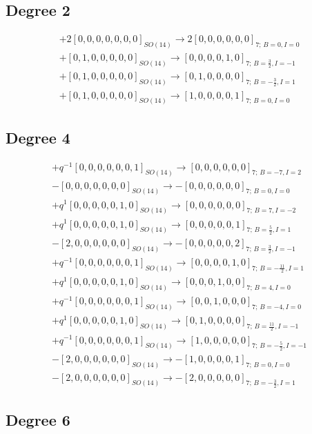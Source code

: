 \documentclass{article}
\begin{document}
\subsection*{Degree 2}
\[\begin{gathered} +2[0,0,0,0,0,0,0]_{SO(14)}\longrightarrow 2[0,0,0,0,0,0]_{7;\,B=0,I=0}\\+[0,1,0,0,0,0,0]_{SO(14)}\longrightarrow [0,0,0,0,1,0]_{7;\,B=\frac{3}{2},I=-1}\\+[0,1,0,0,0,0,0]_{SO(14)}\longrightarrow [0,1,0,0,0,0]_{7;\,B=-\frac{3}{2},I=1}\\+[0,1,0,0,0,0,0]_{SO(14)}\longrightarrow [1,0,0,0,0,1]_{7;\,B=0,I=0}\end{gathered}\]\subsection*{Degree 4}
\[\begin{gathered} +q^{-1}[0,0,0,0,0,0,1]_{SO(14)}\longrightarrow [0,0,0,0,0,0]_{7;\,B=-7,I=2}\\-[0,0,0,0,0,0,0]_{SO(14)}\longrightarrow -[0,0,0,0,0,0]_{7;\,B=0,I=0}\\+q^{1}[0,0,0,0,0,1,0]_{SO(14)}\longrightarrow [0,0,0,0,0,0]_{7;\,B=7,I=-2}\\+q^{1}[0,0,0,0,0,1,0]_{SO(14)}\longrightarrow [0,0,0,0,0,1]_{7;\,B=\frac{5}{2},I=1}\\-[2,0,0,0,0,0,0]_{SO(14)}\longrightarrow -[0,0,0,0,0,2]_{7;\,B=\frac{3}{2},I=-1}\\+q^{-1}[0,0,0,0,0,0,1]_{SO(14)}\longrightarrow [0,0,0,0,1,0]_{7;\,B=-\frac{11}{2},I=1}\\+q^{1}[0,0,0,0,0,1,0]_{SO(14)}\longrightarrow [0,0,0,1,0,0]_{7;\,B=4,I=0}\\+q^{-1}[0,0,0,0,0,0,1]_{SO(14)}\longrightarrow [0,0,1,0,0,0]_{7;\,B=-4,I=0}\\+q^{1}[0,0,0,0,0,1,0]_{SO(14)}\longrightarrow [0,1,0,0,0,0]_{7;\,B=\frac{11}{2},I=-1}\\+q^{-1}[0,0,0,0,0,0,1]_{SO(14)}\longrightarrow [1,0,0,0,0,0]_{7;\,B=-\frac{5}{2},I=-1}\\-[2,0,0,0,0,0,0]_{SO(14)}\longrightarrow -[1,0,0,0,0,1]_{7;\,B=0,I=0}\\-[2,0,0,0,0,0,0]_{SO(14)}\longrightarrow -[2,0,0,0,0,0]_{7;\,B=-\frac{3}{2},I=1}\end{gathered}\]\subsection*{Degree 6}
\end{document}
